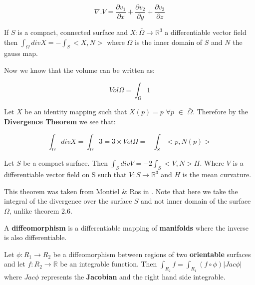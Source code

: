 \documentclass[a4paper,12pt]{report}
\begin{document}
\begin{equation}
\nabla . V = \frac{\partial v_{1}}{\partial x} + \frac{\partial v_{2}}{\partial y} + \frac{\partial v_{3}}{\partial z}
\end{equation}

\begin{theorem}
If $S$ is a compact, connected surface and $X:\bar{\Omega} \rightarrow \mathbb{R}^{3}$ a differentiable vector field then $\int_{\Omega} div X = -\int_{S} <X,N>$ where $\Omega$ is the inner domain of $S$ and $N$ the gauss map.
\end{theorem}

Now we know that the volume can be written as:

\[
Vol\Omega = \int_{\Omega} 1
\]

Let $X$ be an identity mapping such that $X(p) = p$ $\forall p$ $\in$ $\bar{\Omega}$. Therefore by the \textbf{Divergence Theorem} we see that:

\begin{equation}
\int_{\Omega} div X = \int_{\Omega} 3 = 3 \times Vol \Omega = -\int_{S}<p,N(p)>
\end{equation}

\begin{theorem}
Let $S$ be a compact surface. Then $\int_{S} div V = -2\int_{S} <V,N>H$. Where $V$ is a differentiable vector field on S such that $V : S \rightarrow \mathbb{R}^{3}$ and $H$ is the mean curvature.
\end{theorem}

\hspace{-0.66cm}This theorem was taken from Montiel \& Ros in \cite{montiel}. Note that here we take the integral of the divergence over the surface $S$ and not inner domain of the surface $\Omega$, unlike theorem 2.6.

\begin{definition}
A \textbf{diffeomorphism} is a differentiable mapping of \textbf{manifolds} where the inverse is also differentiable.
\end{definition}

\begin{theorem}
Let $\phi: R_{1} \rightarrow R_{2}$ be a diffeomorphism between regions of two \textbf{orientable} surfaces and let $f:R_{2} \rightarrow \mathbb{R}$ be an integrable function. Then $\int_{R_{2}} f = \int_{R_{1}} (f \circ \phi ) |Jac \phi |$ where $Jac \phi$ represents the \textbf{Jacobian} and the right hand side integrable.
\end{theorem}
\end{document}
